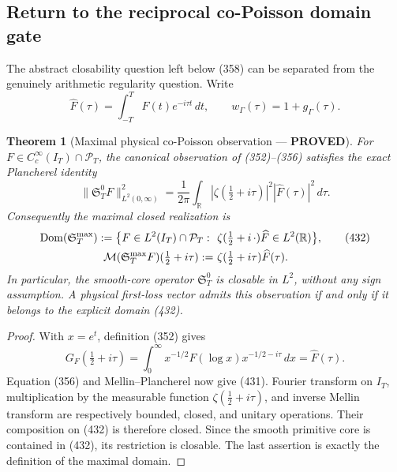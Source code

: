 \documentclass[11pt]{article}
\newtheorem{theorem}{Theorem}
\newcommand{\PROVED}{\textcolor{green!45!black}{\textbf{PROVED}}}
\begin{document}
\subsection{Return to the reciprocal co-Poisson domain gate}

The abstract closability question left below (358) can be separated from
the genuinely arithmetic regularity question.  Write
\[
 \widehat F(\tau)=\int_{-T}^{T}F(t)e^{-i\tau t}\,dt,
 \qquad
 w_\Gamma(\tau)=1+g_\Gamma(\tau).
\]

\begin{theorem}[Maximal physical co-Poisson observation --- \PROVED]
For $F\in C_c^\infty(I_T)\cap\mathcal P_T$, the canonical observation
of (352)--(356) satisfies the exact Plancherel identity
\begin{equation}
 \boxed{
 \|\mathfrak S_T^0F\|_{L^2(0,\infty)}^2
 =\frac1{2\pi}\int_{\mathbb R}
   |\zeta(\tfrac12+i\tau)|^2|\widehat F(\tau)|^2\,d\tau.}       \tag{431}
\end{equation}
Consequently the maximal closed realization is
\begin{align}
 \operatorname{Dom}(\mathfrak S_T^{\max})
 :=\bigl\{F\in L^2(I_T)\cap\mathcal P_T:\
 &\ \zeta(\tfrac12+i\,\cdot)\widehat F
       \in L^2(\mathbb R)\bigr\},                  \tag{432}\\
 \mathcal M(\mathfrak S_T^{\max}F)(\tfrac12+i\tau)
 :=&\ \zeta(\tfrac12+i\tau)\widehat F(\tau).
 \notag
\end{align}
In particular, the smooth-core operator $\mathfrak S_T^0$ is closable in
$L^2$, without any sign assumption.  A physical first-loss vector admits
this observation if and only if it belongs to the explicit domain (432).
\end{theorem}

\begin{proof}
With $x=e^t$, definition (352) gives
\[
 G_F(\tfrac12+i\tau)
 =\int_0^\infty x^{-1/2}F(\log x)x^{-1/2-i\tau}\,dx
 =\widehat F(\tau).
\]
Equation (356) and Mellin--Plancherel now give (431).  Fourier transform on
$I_T$, multiplication by the measurable function
$\zeta(\tfrac12+i\tau)$, and inverse Mellin transform are respectively
bounded, closed, and unitary operations.  Their composition on (432) is
therefore closed.  Since the smooth primitive core is contained in (432),
its restriction is closable.  The last assertion is exactly the definition
of the maximal domain.
\end{proof}
\end{document}
